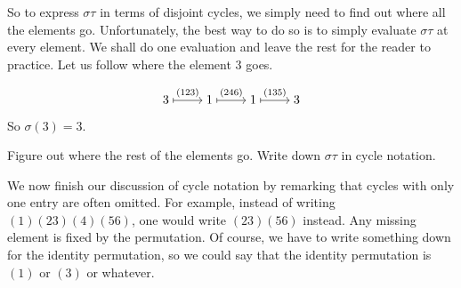\documentclass[./main.tex]{subfiles}
\begin{document}
So to express $\sigma \tau$ in terms of disjoint cycles, we simply need to find
out where all the elements go. Unfortunately, the best way to do so is to simply
evaluate $\sigma \tau$ at every element. We shall do one evaluation and leave
the rest for the reader to practice. Let us follow where the element 3 goes. 

\[\begin{tikzcd}[cramped]
	3 & 1 & 1 & 3
	\arrow["{(123)}", maps to, from=1-1, to=1-2]
	\arrow["{(246)}", maps to, from=1-2, to=1-3]
	\arrow["{(135)}", maps to, from=1-3, to=1-4]
\end{tikzcd}\]

So $\sigma(3) = 3$.

\begin{exercise}
    Figure out where the rest of the elements go. Write down $\sigma \tau$ in
    cycle notation.
\end{exercise}

We now finish our discussion of cycle notation by remarking that cycles with
only one entry are often omitted. For example, instead of writing
$(1)(23)(4)(56)$, one would write $(23)(56)$ instead. Any missing element is
fixed by the permutation. Of course, we have to write something down for the
identity permutation, so we could say that the identity permutation is $(1)$ or
$(3)$ or whatever.
\end{document}
